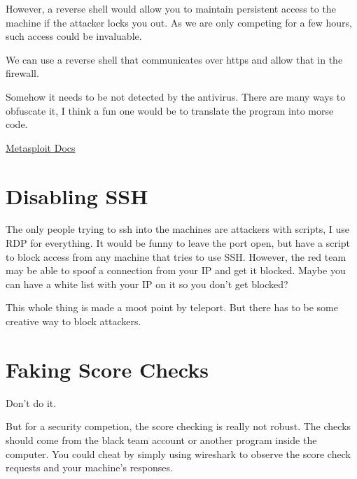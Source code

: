 \documentclass{article}
\begin{document}
However, a reverse shell would allow you to maintain persistent access to the machine if the attacker locks you out.
As we are only competing for a few hours, such access could be invaluable.

We can use a reverse shell that communicates over https and allow that in the firewall.

Somehow it needs to be not detected by the antivirus. There are many ways to obfuscate it, I think a fun one would be
to translate the program into morse code.

\href{https://docs.metasploit.com/docs/using-metasploit/basics/how-to-use-a-reverse-shell-in-metasploit.html\#windows-common-reverse-shell}{Metasploit Docs}

\section{Disabling SSH}
The only people trying to ssh into the machines are attackers with scripts, I use RDP for everything.
It would be funny to leave the port open, but have a script to block access from any machine that tries to use SSH.
However, the red team may be able to spoof a connection from your IP and get it blocked.
Maybe you can have a white list with your IP on it so you don't get blocked?

This whole thing is made a moot point by teleport. But there has to be some creative way to block attackers.

\section{Faking Score Checks}
Don't do it.

But for a security competion, the score checking is really not robust. 
The checks should come from the black team account or another program inside the computer.
You could cheat by simply using wireshark to observe the score check requests and your machine's responses.
\end{document}

